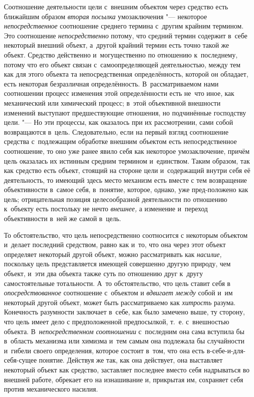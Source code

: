 Соотношение деятельности цели с~внешним объектом через
средство есть ближайшим образом {\em вторая посылка}
умозаключения "--- некоторое {\em непосредственное}
соотношение среднего термина с~другим крайним термином. Это
соотношение {\em непосредственно}
потому, что средний термин содержит в~себе некоторый внешний
объект, а~другой крайний термин есть точно такой же объект. Средство
действенно и~могущественно по отношению к~последнему, потому что его объект
связан с~самоопределяющей деятельностью, между тем как для этого объекта та
непосредственная определённость, которой он обладает, есть некоторая
безразличная определённость. В~рассматриваемом нами соотношении процесс
изменения этой определённости есть не~что иное, как механический или
химический процесс; в~этой объективной внешности изменений выступают
предшествующие отношения, но подчинённые господству цели. "---
Но эти процессы, как оказалось при их рассмотрении, сами
собой возвращаются в~цель. Следовательно, если на первый взгляд соотношение
средства с~подлежащим обработке внешним объектом есть непосредственное
соотношение, то оно уже ранее явило себя как некоторое умозаключение,
причём цель оказалась их истинным средним термином и~единством. Таким
образом, так как средство есть объект, стоящий на стороне цели и~содержащий
внутри себя её деятельность, то имеющий здесь место механизм есть вместе с
тем возвращение объективности в~самое себя, в~понятие, которое, однако, уже
пред-положено как цель; отрицательная позиция целесообразной деятельности
по отношению к~объекту есть постольку не нечто
{\em внешнее,} а
изменение и~переход объективности в~ней же самой в~цель.

То обстоятельство, что цель непосредственно соотносится с
некоторым объектом и~делает последний средством, равно как и~то, что она
через этот объект определяет некоторый другой объект, можно рассматривать
как {\em насилие,}
поскольку цель представляется имеющей совершенно другую
природу, чем объект, и~эти два объекта также суть по отношению друг к~другу
самостоятельные тотальности. А~то обстоятельство, что цель ставит себя в
{\em опосредствованное}
соотношение с~объектом и
{\em вдвигает между}
собой и~им некоторый другой объект, может быть рассматриваемо
как {\em хитрость}
разума. Конечность разумности заключает в~себе, как было
замечено выше, ту сторону, что цель имеет дело с
предположенной предпосылкой, т.~е. с~внешностью объекта.
В~{\em непосредственном соотношении}
с~последним она сама вступила бы в~область механизма или
химизма и~тем самым она подлежала бы случайности и~гибели своего
определения, которое состоит в~том, что она есть в-себе-и-для-себя-сущее
понятие. Действуя же так, как она действует, она выставляет некоторый
объект как средство, заставляет последнее вместо себя надрываться во
внешней работе, обрекает его на изнашивание и, прикрытая им, сохраняет себя
против механического насилия.

